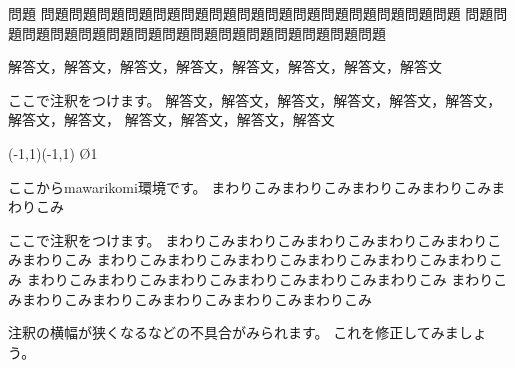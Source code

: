\documentclass[a4j,fleqn]{jarticle}
\begin{document}
\begin{itembox}{問題}
問題問題問題問題問題問題問題問題問題問題問題問題問題問題問題
問題問題問題問題問題問題問題問題問題問題問題問題問題問題問題
\end{itembox}
\begin{tyuukai}
解答文，解答文，解答文，解答文，解答文，解答文，解答文，解答文

ここで注釈をつけます。
解答文，解答文，解答文，解答文，解答文，解答文，解答文，解答文，
解答文，解答文，解答文，解答文

\begin{mawarikomi}{}{%
  \begin{zahyou*}[ul=1cm](-1,1)(-1,1)
    \Drawline{\LT\LB\RB\RT\LT}
    \En\O1
  \end{zahyou*}}
ここから\textsf{mawarikomi}環境です。
まわりこみまわりこみまわりこみまわりこみまわりこみ

ここで注釈をつけます。
まわりこみまわりこみまわりこみまわりこみまわりこみまわりこみ
まわりこみまわりこみまわりこみまわりこみまわりこみまわりこみ
まわりこみまわりこみまわりこみまわりこみまわりこみまわりこみ
まわりこみまわりこみまわりこみまわりこみまわりこみまわりこみ
\end{mawarikomi}
\end{tyuukai}

注釈の横幅が狭くなるなどの不具合がみられます。
これを修正してみましょう。
\end{document}
